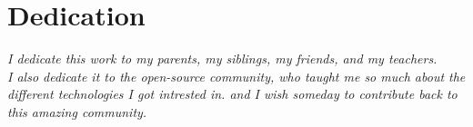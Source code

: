 \chapter*{\huge Dedication}

\begin{center}
\it \Large
I dedicate this work to my parents, my siblings, my friends, and my teachers.\\
I also dedicate it to the open-source community, who taught me so much about the different technologies I got intrested in. and I wish someday to contribute back to this amazing community.\\
\end{center}